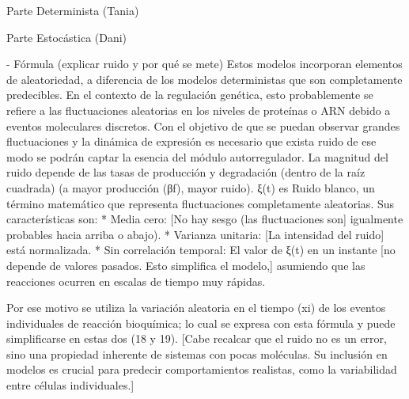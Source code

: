 Parte Determinista (Tania)


Parte Estocástica (Dani)

- Fórmula (explicar ruido y por qué se mete)
Estos modelos incorporan elementos de aleatoriedad, a diferencia de los modelos deterministas que son completamente predecibles. En el contexto de la regulación genética, esto probablemente se refiere a las fluctuaciones aleatorias en los niveles de proteínas o ARN debido a eventos moleculares discretos. 
Con el objetivo de que se puedan observar grandes fluctuaciones y la dinámica de expresión es necesario que exista ruido de ese modo se podrán captar la esencia del módulo autorregulador.
La magnitud del ruido depende de las tasas de producción y degradación (dentro de la raíz cuadrada) (a mayor producción (βf), mayor ruido).
ξ(t) es Ruido blanco, un término matemático que representa fluctuaciones completamente aleatorias. Sus características son: 
* Media cero: [No hay sesgo (las fluctuaciones son] igualmente probables hacia arriba o abajo). 
* Varianza unitaria: [La intensidad del ruido] está normalizada. 
* Sin correlación temporal: El valor de ξ(t) en un instante [no depende de valores pasados. Esto simplifica el modelo,] asumiendo que las reacciones ocurren en escalas de tiempo muy rápidas.

Por ese motivo se utiliza la variación aleatoria en el tiempo (xi) de los eventos individuales de reacción bioquímica; lo cual se expresa con esta fórmula y puede simplificarse en estas dos (18 y 19).
[Cabe recalcar que el ruido no es un error, sino una propiedad inherente de sistemas con pocas moléculas. Su inclusión en modelos es crucial para predecir comportamientos realistas, como la variabilidad entre células individuales.]


